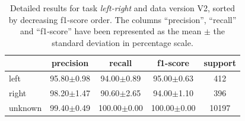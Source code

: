 \begin{table}[h!] \centering \scriptsize
	\caption[Speech commands precision-recall for \textit{left-right} task]{Detailed results for task \textit{left-right} and data version V2, sorted by decreasing f1-score order. The columns ``precision'', ``recall'' and ``f1-score'' have been represented as the mean $\pm$ the standard deviation in percentage scale. } \label{tab:kwsperclassresults2}
	\begin{tabular}{lcccc}
		\toprule
		{} &       precision &           recall &         f1-score & support \\
		\midrule
		left      &  95.80$\pm$0.98 &   94.00$\pm$0.89 &   95.00$\pm$0.63 &     412 \\
		right     &  98.20$\pm$1.47 &   90.60$\pm$2.65 &   94.00$\pm$1.10 &     396 \\
		unknown   &  99.40$\pm$0.49 &  100.00$\pm$0.00 &  100.00$\pm$0.00 &   10197 \\
		\bottomrule
	\end{tabular}
\end{table}

